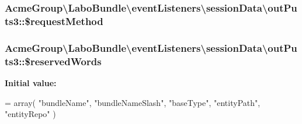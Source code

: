 \hypertarget{class_acme_group_1_1_labo_bundle_1_1event_listeners_1_1session_data_1_1out_puts3_a030b3a20ba66f7ba9dff28350f964ae4}{
\subsubsection[{\$request\+Method}]{\setlength{\rightskip}{0pt plus 5cm}Acme\+Group\textbackslash{}\+Labo\+Bundle\textbackslash{}event\+Listeners\textbackslash{}session\+Data\textbackslash{}out\+Puts3\+::\$request\+Method\hspace{0.3cm}{\ttfamily [protected]}}}\label{class_acme_group_1_1_labo_bundle_1_1event_listeners_1_1session_data_1_1out_puts3_a030b3a20ba66f7ba9dff28350f964ae4}
\hypertarget{class_acme_group_1_1_labo_bundle_1_1event_listeners_1_1session_data_1_1out_puts3_a2f3fe4080c8e9cd1c86bfccebdc24803}{
\subsubsection[{\$reserved\+Words}]{\setlength{\rightskip}{0pt plus 5cm}Acme\+Group\textbackslash{}\+Labo\+Bundle\textbackslash{}event\+Listeners\textbackslash{}session\+Data\textbackslash{}out\+Puts3\+::\$reserved\+Words\hspace{0.3cm}{\ttfamily [protected]}}}\label{class_acme_group_1_1_labo_bundle_1_1event_listeners_1_1session_data_1_1out_puts3_a2f3fe4080c8e9cd1c86bfccebdc24803}
{\bfseries Initial value\+:}
\begin{DoxyCode}
= array( 
        \textcolor{stringliteral}{"bundleName"},       
        \textcolor{stringliteral}{"bundleNameSlash"},  
        \textcolor{stringliteral}{"baseType"},         
        \textcolor{stringliteral}{"entityPath"},       
        \textcolor{stringliteral}{"entityRepo"}        
        )
\end{DoxyCode}

